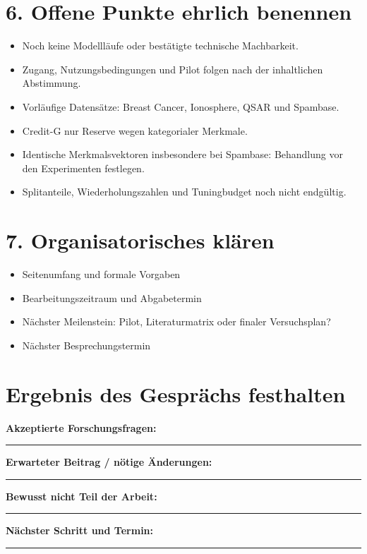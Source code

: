\documentclass[11pt,a4paper]{article}
\begin{document}
\section*{6. Offene Punkte ehrlich benennen}

\begin{itemize}
  \item Noch keine Modellläufe oder bestätigte technische Machbarkeit.
  \item Zugang, Nutzungsbedingungen und Pilot folgen nach der inhaltlichen Abstimmung.
  \item Vorläufige Datensätze: Breast Cancer, Ionosphere, QSAR und Spambase.
  \item Credit-G nur Reserve wegen kategorialer Merkmale.
  \item Identische Merkmalsvektoren insbesondere bei Spambase:
        Behandlung vor den Experimenten festlegen.
  \item Splitanteile, Wiederholungszahlen und Tuningbudget noch nicht endgültig.
\end{itemize}

\section*{7. Organisatorisches klären}

\begin{itemize}
  \item Seitenumfang und formale Vorgaben
  \item Bearbeitungszeitraum und Abgabetermin
  \item Nächster Meilenstein: Pilot, Literaturmatrix oder finaler Versuchsplan?
  \item Nächster Besprechungstermin
\end{itemize}

\section*{Ergebnis des Gesprächs festhalten}

\textbf{Akzeptierte Forschungsfragen:}\\[1.1em]
\hrule
\vspace{1em}
\textbf{Erwarteter Beitrag / nötige Änderungen:}\\[1.1em]
\hrule
\vspace{1em}
\textbf{Bewusst nicht Teil der Arbeit:}\\[1.1em]
\hrule
\vspace{1em}
\textbf{Nächster Schritt und Termin:}\\[1.1em]
\hrule
\end{document}
